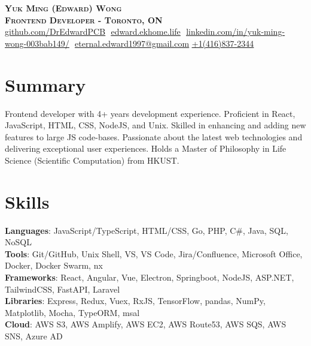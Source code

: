 \documentclass[letterpaper,11pt]{article}
\begin{document}

\vspace*{-7pt}

\begin{center}
    \textbf{\Huge \scshape Yuk Ming (Edward) Wong} \\ \vspace{8pt}
      \textbf{\small \scshape Frontend Developer - Toronto, ON} \\ \vspace{8pt}
    \small 
    \href{https://github.com/DrEdwardPCB}{\underline{github.com/DrEdwardPCB}} $  $
    \href{https://edward.ekhome.life}
    {\underline{edward.ekhome.life}} $  $
    \href{https://www.linkedin.com/in/yuk-ming-wong-003bab149/}{\underline{linkedin.com/in/yuk-ming-wong-003bab149/}} $  $\newline
    \href{mailto:eternal.edward1997@gmail.com}
    {\underline{eternal.edward1997@gmail.com}}$  $
    \href{tel:+14168372344}
    {\underline{+1(416)837-2344}}
\end{center}
\section{Summary}
  {\small{Frontend developer with 4+ years development experience. Proficient in React, JavaScript, HTML, CSS, NodeJS, and Unix. Skilled in enhancing and adding new features to large JS code-bases. Passionate about the latest web technologies and delivering exceptional user experiences. Holds a Master of Philosophy in Life Science (Scientific Computation) from HKUST.}}
  
\section{Skills}
 \begin{itemize}[leftmargin=0.15in, label={}]
    \small{\item{
    
     \textbf{Languages}{: JavaScript/TypeScript, HTML/CSS, Go, PHP, C\#, Java, SQL, NoSQL} \\
     
     \textbf{Tools}{: Git/GitHub, Unix Shell, VS, VS Code, Jira/Confluence, Microsoft Office, Docker, Docker Swarm, nx }\\
     
    \textbf{Frameworks}{: React, Angular, Vue, Electron, Springboot, NodeJS, ASP.NET, TailwindCSS, FastAPI, Laravel}\\
    \textbf{Libraries}{: Express, Redux, Vuex, RxJS, TensorFlow, pandas, NumPy, Matplotlib, Mocha, TypeORM, msal}\\
    \textbf{Cloud}{: AWS S3, AWS Amplify, AWS EC2, AWS Route53, AWS SQS, AWS SNS, Azure AD}
     
    }}
 \end{itemize}
 
\end{document}

